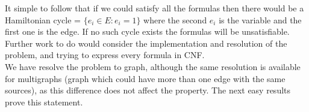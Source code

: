 It simple to follow that if we could satisfy all the formulas then there would be a Hamiltonian cycle = $\{e_i\in E : e_i = 1\}$ where the second $e_i$ is the variable and the first one is the edge. If no such cycle exists the formulas will be unsatisfiable. Further work to do would consider the implementation and resolution of the problem, and trying to express every formula in CNF.\\


We have resolve the problem to graph, although the same resolution is available for multigraphs (graph which could have more than one edge with the same sources), as this difference does not affect the property. The next easy results prove this statement.


